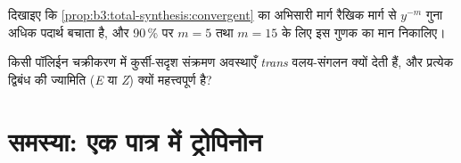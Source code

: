 \begin{exercise}[$\star\star\star$]\label{exo:b3:total-synthesis:11}
दिखाइए कि \cref{prop:b3:total-synthesis:convergent} का अभिसारी मार्ग रैखिक मार्ग से
$y^{-m}$ गुना अधिक पदार्थ बचाता है, और 90\,\% पर $m = 5$ तथा
$m = 15$ के लिए इस गुणक का मान निकालिए।
\end{exercise}

\begin{exercise}[$\star\star\star$]\label{exo:b3:total-synthesis:12}
किसी पॉलिईन चक्रीकरण में कुर्सी-सदृश संक्रमण अवस्थाएँ \textit{trans} वलय-संगलन
क्यों देती हैं, और प्रत्येक द्विबंध की ज्यामिति (\textit{E} या \textit{Z}) क्यों महत्त्वपूर्ण है?
\end{exercise}

\section{समस्या: एक पात्र में ट्रोपिनोन}

